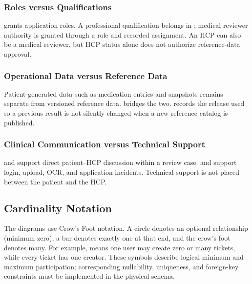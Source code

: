 \subsubsection{Roles versus Qualifications}

 grants application roles. A professional qualification belongs in ; medical reviewer authority is granted through a role and recorded assignment. An HCP can also be a medical reviewer, but HCP status alone does not authorize reference-data approval.

\subsubsection{Operational Data versus Reference Data}

Patient-generated data such as medication entries and snapshots remains separate from versioned reference data.  bridges the two.  records the release used so a previous result is not silently changed when a new reference catalog is published.

\subsubsection{Clinical Communication versus Technical Support}

 and  support direct patient--HCP discussion within a review case.  and  support login, upload, OCR, and application incidents. Technical support is not placed between the patient and the HCP.

\subsection{Cardinality Notation}

The diagrams use Crow's Foot notation. A circle denotes an optional relationship (minimum zero), a bar denotes exactly one at that end, and the crow's foot denotes many. For example,  means one user may create zero or many tickets, while every ticket has one creator. These symbols describe logical minimum and maximum participation; corresponding nullability, uniqueness, and foreign-key constraints must be implemented in the physical schema.

